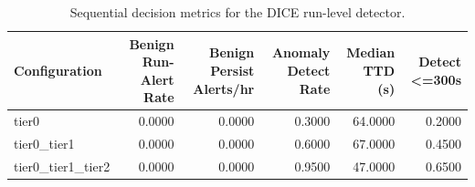 \begin{table}[t]
\centering
\caption{Sequential decision metrics for the DICE run-level detector.}
\label{tab:dice_sequential_metrics}
\footnotesize
\begin{tabular}{lrrrrr}
\toprule
Configuration & Benign Run-Alert Rate & Benign Persist Alerts/hr & Anomaly Detect Rate & Median TTD (s) & Detect <=300s \\
\midrule
tier0 & 0.0000 & 0.0000 & 0.3000 & 64.0000 & 0.2000 \\
tier0_tier1 & 0.0000 & 0.0000 & 0.6000 & 67.0000 & 0.4500 \\
tier0_tier1_tier2 & 0.0000 & 0.0000 & 0.9500 & 47.0000 & 0.6500 \\
\bottomrule
\end{tabular}

\end{table}
